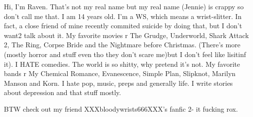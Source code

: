 Hi, I'm Raven. That's not my real name but my real name (Jennie) is crappy
so don't call me that. I am 14 years old. I'm a WS, which means a wrist-slitter.
In fact, a close friend of mine recently commited suicide by doing that,
but I don't want2 talk about it. My favorite movies r The Grudge, Underworld,
Shark Attack 2, The Ring, Corpse Bride and the Nightmare before Christmas.
(There's more (mostly horror and stuff even tho they don't scare me)but I don't
feel like lisitinf it). I HATE comedies. The world is so shitty, why pretend it's not.
My favorite bands r My Chemical Romance, Evanescence, Simple Plan, Slipknot,
Marilyn Manson and Korn. I hate pop, music, preps and generally life.
I write stories about depression and that stuff mostly.

BTW check out my friend XXXbloodywrists666XXX's fanfic 2- it fucking rox.
